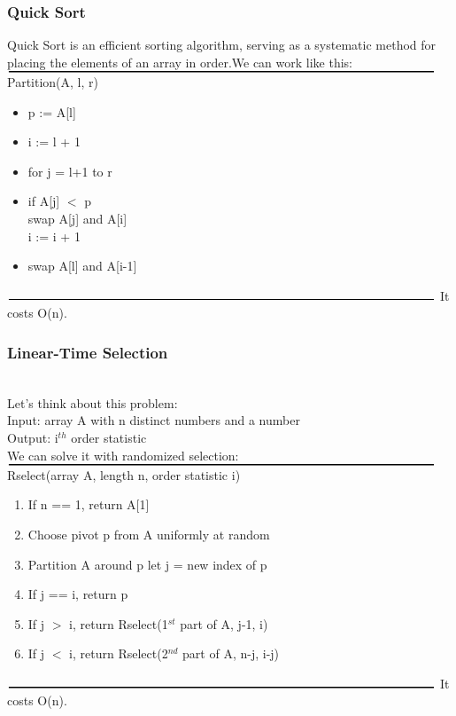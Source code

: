 \documentclass{article}
\begin{document}
\subsubsection{Quick Sort}
Quick Sort is an efficient sorting algorithm, serving as a systematic method for placing the elements of an array in order.We can work like this:\\
$\rule{\textwidth}{0.3mm}$
Partition(A, l, r)
\begin{itemize}
  \item p := A[l]
  \item i := l + 1
  \item for j = l+1 to r
  \item if A[j] $<$ p\\
   swap A[j] and A[i]\\
   i := i + 1
  \item swap A[l] and A[i-1]
\end{itemize}
$\rule{\textwidth}{0.3mm}$
It costs O(n).

\subsubsection{Linear-Time Selection}
\\
Let's think about this problem:\\
Input: array A with n distinct numbers and a number\\
Output: i$^{th}$ order statistic\\
We can solve it with randomized selection:\\
$\rule{\textwidth}{0.3mm}$
Rselect(array A, length n, order statistic i)
\begin{enumerate}
  \item If n == 1, return A[1]
  \item Choose pivot p from A uniformly at random
  \item Partition A around p let j = new index of p
  \item If j == i, return p
  \item If j $>$ i, return Rselect(1$^{st}$ part of A, j-1, i)
  \item If j $<$ i, return Rselect(2$^{nd}$ part of A, n-j, i-j)
\end{enumerate}
$\rule{\textwidth}{0.3mm}$
It costs O(n).
\end{document}
